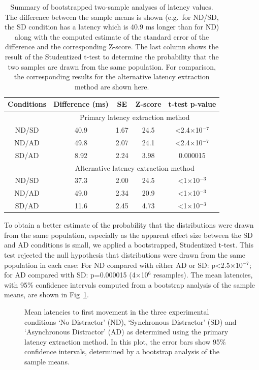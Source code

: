 \documentclass[10pt,letterpaper]{article}
\begin{document}
\begin{table}[ht]
\caption{Summary of bootstrapped two-sample analyses of latency
  values. The difference between the sample means is shown (e.g.~for
  ND/SD, the SD condition has a latency which is 40.9 ms longer than
  for ND) along with the computed estimate of the standard error of
  the difference and the corresponding Z-score. The last column shows
  the result of the Studentized t-test to determine the probability
  that the two samples are drawn from the same population. For
  comparison, the corresponding results for the alternative latency
  extraction method are shown here.}  \centering
\begin{tabular}{c c c c c}
\hline
\textbf{Conditions} & \textbf{Difference (ms)} & \textbf{SE} & \textbf{Z-score} & \textbf{t-test p-value} \\ [0.5ex]
\hline
~ & \multicolumn{4}{c}{Primary latency extraction method} \\
\hline
ND/SD & 40.9 & 1.67 & 24.5 & \textless2.4$\times$10$^{-7}$ \\
ND/AD & 49.8 & 2.07 & 24.1 & \textless2.4$\times$10$^{-7}$ \\
SD/AD & 8.92 & 2.24 & 3.98 & 0.000015 \\ [1ex]
\hline
~ & \multicolumn{4}{c}{Alternative latency extraction method} \\
\hline
ND/SD & 37.3 & 2.00 & 24.5 & \textless1$\times$10$^{-3}$ \\
ND/AD & 49.0 & 2.34 & 20.9 & \textless1$\times$10$^{-3}$ \\
SD/AD & 11.6 & 2.45 & 4.73 & \textless1$\times$10$^{-3}$ \\ [1ex]
\hline
\end{tabular}
\label{table:twosample}
\end{table}

To obtain a better estimate of the probability that the distributions
were drawn from the same population, especially as the apparent effect
size between the SD and AD conditions is small, we applied a
bootstrapped, Studentized t-test. This test rejected the null
hypothesis that distributions were drawn from the same population in
each case: For ND compared with either AD or SD:
p\textless2.5$\times$10$^{-7}$; for AD compared with SD: p=0.000015
(4$\times$10$^{6}$ resamples). The mean latencies, with 95\%
confidence intervals computed from a bootstrap analysis of the sample
means, are shown in Fig~\ref{meanmad}.

\begin{figure}[htb!]
\centering
\caption[Mean latencies] {Mean latencies to first movement in the
  three experimental conditions `No Distractor' (ND), `Synchronous
  Distractor' (SD) and `Asynchronous Distractor' (AD) as determined
  using the primary latency extraction method. In this plot, the
  error bars show 95\% confidence intervals, determined by a bootstrap
  analysis of the sample means.}
\label{meanmad}
\end{figure}
\end{document}
